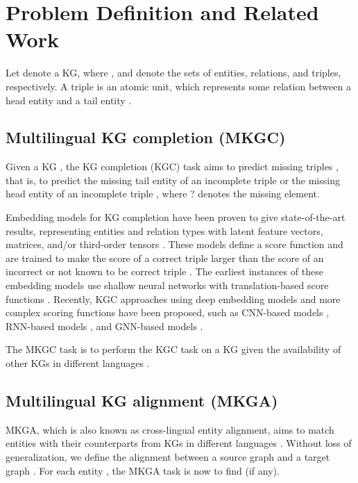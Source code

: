 \documentclass[11pt]{article}
\begin{document}
\section{Problem Definition and Related Work}

Let   denote a KG, where ,   and  denote the sets of entities, relations, and triples, respectively. A triple  is an atomic unit, which represents some relation  between a head entity  and a tail entity . 

\subsection{Multilingual KG completion (MKGC)}\label{ssec:mkgc}


Given a KG , the KG completion (KGC) task aims to predict missing triples , that is, to predict the missing tail entity  of an incomplete triple  or the missing head entity  of an incomplete triple , where ? denotes the missing element. 

Embedding models for KG completion have been proven to give state-of-the-art results, representing entities and relation types with latent feature vectors, matrices, and/or third-order tensors \cite{Nguyen2020KGC,Ji_2021}. These models define a score function  and are trained to make the score  of a correct triple  larger than the score  of an incorrect or not known to be correct triple . 
The earliest instances of these embedding models use shallow neural networks with translation-based score functions \cite{bordes2013translating, wang2014knowledge, lin2015learning}. Recently, KGC approaches using deep embedding models and more complex scoring functions have been proposed, such as CNN-based models \cite{dettmers2018convolutional, nguyen2017novel}, RNN-based models \cite{liu2017analogical, guo2018dskg}, and GNN-based models \cite{SchlichtkrullKB17,shang2019end, vashishth2019composition,nguyen2021node}.

The MKGC task is to perform the KGC task on a KG given the availability of other KGs in different languages \cite{chen2020multilingual,huang2022multilingual}.

\subsection{Multilingual KG alignment (MKGA)}\label{ssec:mkga}

MKGA, which is also known as cross-lingual entity alignment, aims to match entities with their counterparts from KGs in different languages \cite{MTransE,wang2018cross,wu2019relation, sun2020knowledge}. Without loss of generalization, we define the alignment between a source graph  and a target graph . For each entity , the MKGA task is now to find  (if any). 
\end{document}
